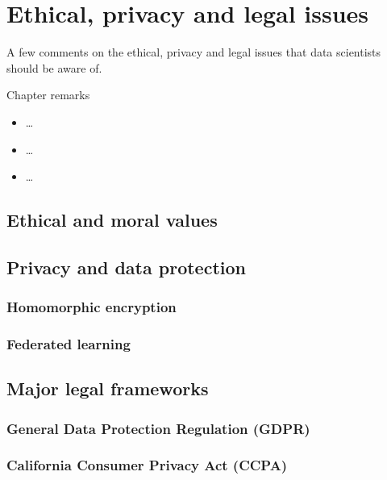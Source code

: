 \chapter{Ethical, privacy and legal issues}
\label{chap:ethics}


A few comments on the ethical, privacy and legal issues that data scientists should be aware of.

\begin{mainbox}{Chapter remarks}


  \startcontents[chapters]
  \vspace{1em}


  \begin{itemize}
    \item \dots
  \end{itemize}


  \begin{itemize}
    \item \dots
  \end{itemize}


  \begin{itemize}
    \item \dots
  \end{itemize}
\end{mainbox}

{}
\clearpage

\section{Ethical and moral values}

\section{Privacy and data protection}

\subsection{Homomorphic encryption}

\subsection{Federated learning}

\section{Major legal frameworks}

\subsection{General Data Protection Regulation (GDPR)}

\subsection{California Consumer Privacy Act (CCPA)}
